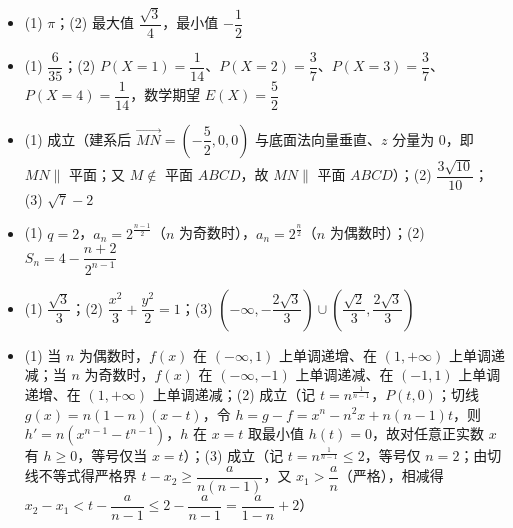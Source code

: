 \begin{itemize}[leftmargin=2.6em]
  \item[\textbf{15.}] (1) \(\pi\)；(2) 最大值 \(\dfrac{\sqrt{3}}{4}\)，最小值 \(-\dfrac{1}{2}\)
  \item[\textbf{16.}] (1) \(\dfrac{6}{35}\)；(2) \(P(X=1)=\dfrac{1}{14}\)、\(P(X=2)=\dfrac{3}{7}\)、\(P(X=3)=\dfrac{3}{7}\)、\(P(X=4)=\dfrac{1}{14}\)，数学期望 \(E(X)=\dfrac{5}{2}\)
  \item[\textbf{17.}] (1) 成立（建系后 \(\overrightarrow{MN}=\left(-\dfrac52,0,0\right)\) 与底面法向量垂直、\(z\) 分量为 0，即 \(MN\parallel\) 平面；又 \(M\notin\) 平面 \(ABCD\)，故 \(MN\parallel\) 平面 \(ABCD\)）；(2) \(\dfrac{3\sqrt{10}}{10}\)；(3) \(\sqrt{7}-2\)
  \item[\textbf{18.}] (1) \(q=2\)，\(a_n=2^{\frac{n-1}{2}}\)（\(n\) 为奇数时），\(a_n=2^{\frac{n}{2}}\)（\(n\) 为偶数时）；(2) \(S_n=4-\dfrac{n+2}{2^{n-1}}\)
  \item[\textbf{19.}] (1) \(\dfrac{\sqrt{3}}{3}\)；(2) \(\dfrac{x^2}{3}+\dfrac{y^2}{2}=1\)；(3) \(\left(-\infty,-\dfrac{2\sqrt{3}}{3}\right)\cup\left(\dfrac{\sqrt{2}}{3},\dfrac{2\sqrt{3}}{3}\right)\)
  \item[\textbf{20.}] (1) 当 \(n\) 为偶数时，\(f(x)\) 在 \((-\infty,1)\) 上单调递增、在 \((1,+\infty)\) 上单调递减；当 \(n\) 为奇数时，\(f(x)\) 在 \((-\infty,-1)\) 上单调递减、在 \((-1,1)\) 上单调递增、在 \((1,+\infty)\) 上单调递减；(2) 成立（记 \(t=n^{\frac{1}{n-1}}\)，\(P(t,0)\)；切线 \(g(x)=n(1-n)(x-t)\)，令 \(h=g-f=x^n-n^2x+n(n-1)t\)，则 \(h'=n\left(x^{n-1}-t^{n-1}\right)\)，\(h\) 在 \(x=t\) 取最小值 \(h(t)=0\)，故对任意正实数 \(x\) 有 \(h\geqslant0\)，等号仅当 \(x=t\)）；(3) 成立（记 \(t=n^{\frac{1}{n-1}}\leqslant2\)，等号仅 \(n=2\)；由切线不等式得严格界 \(t-x_2\geqslant\dfrac{a}{n(n-1)}\)，又 \(x_1>\dfrac{a}{n}\)（严格），相减得 \(x_2-x_1<t-\dfrac{a}{n-1}\leqslant2-\dfrac{a}{n-1}=\dfrac{a}{1-n}+2\)）
\end{itemize}
